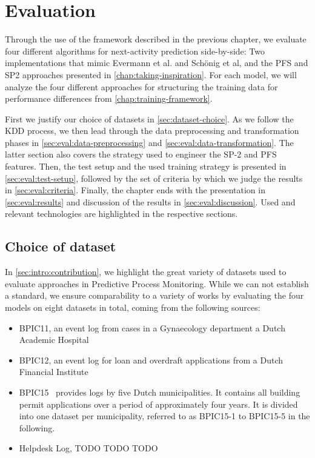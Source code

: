 \chapter{Evaluation}\label{chap:evaluation}
Through the use of the framework described in the previous chapter, we evaluate four different algorithms for next-activity prediction side-by-side: Two implementations that mimic Evermann et al. and Schönig et al, and the PFS and SP2 approaches presented in \autoref{chap:taking-inspiration}. For each model, we will analyze the four different approaches for structuring the training data for performance differences from \autoref{chap:training-framework}.

First we justify our choice of datasets in \autoref{sec:dataset-choice}. As we follow the KDD process, we then lead through the data preprocessing and transformation phases in \autoref{sec:eval:data-preprocessing} and \autoref{sec:eval:data-transformation}. The latter section also covers the strategy used to engineer the SP-2 and PFS features. Then, the test setup and the used training strategy is presented in \autoref{sec:eval:test-setup}, followed by the set of criteria by which we judge the results in \autoref{sec:eval:criteria}. Finally, the chapter ends with the presentation in \autoref{sec:eval:results} and discussion of the results in \autoref{sec:eval:discussion}. Used and relevant technologies are highlighted in the respective sections.

\section{Choice of dataset}
\label{sec:dataset-choice}
In \autoref{sec:intro:contribution}, we highlight the great variety of datasets used to evaluate approaches in Predictive Process Monitoring. While we can not establish a standard, we ensure comparability to a variety of works by evaluating the four models on eight datasets in total, coming from the following sources:

\begin{itemize}
    \item BPIC11, an event log from cases in a Gynaecology department a Dutch Academic Hospital~\cite{BPIC2011}
    \item BPIC12, an event log for loan and overdraft applications from a Dutch Financial Institute~\cite{BPIC2012}
    \item BPIC15~\cite{BPIC2015} provides logs by five Dutch municipalities. It contains all building permit applications over a period of approximately four years. It is divided into one dataset per municipality, referred to as BPIC15-1 to BPIC15-5 in the following.
    \item Helpdesk Log, TODO TODO TODO
\end{itemize}


